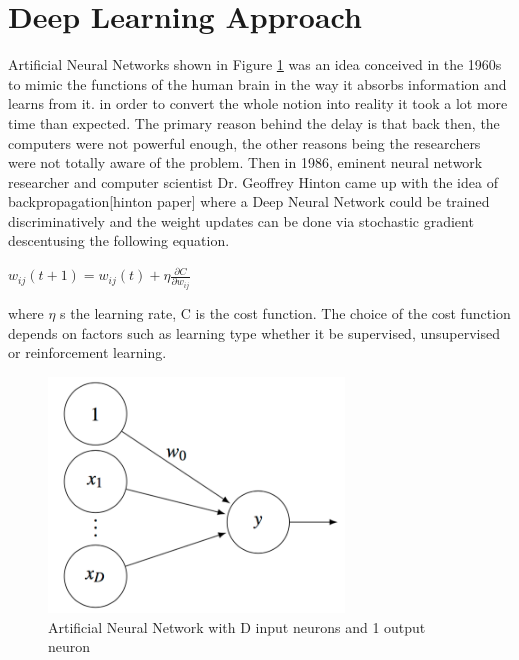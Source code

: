 \section{Deep Learning Approach} \label{sec:build4}

Artificial Neural Networks shown in Figure \ref{fig:Figure20} was an idea conceived  in the 1960s to mimic the functions of the human brain in the way it absorbs information and learns from it. in order to  convert the whole notion into reality it took a lot more time than expected. The primary reason behind the delay is that back then, the computers were not powerful enough, the other reasons being the researchers were not totally aware of the problem. Then in 1986, eminent neural network researcher and computer scientist Dr. Geoffrey Hinton came up with the idea of backpropagation[hinton paper] where a Deep Neural Network could be trained discriminatively and the weight updates can be done via stochastic gradient descentusing the following equation.

\begin{center}
	$w_{ij}(t+1) = w_{ij}(t) + \eta \frac{\partial C}{\partial w_{ij}}$
\end{center}
where $\eta$ s the learning rate, C is the cost function. The choice of the cost function depends on factors such as learning type whether it be supervised, unsupervised or reinforcement learning. 

\begin{figure}[t]
	\begin{center}
		\includegraphics[width=0.7\textwidth]{Figures/Figure20}
	\end{center}
	\caption{Artificial Neural Network with D input neurons and 1 output neuron} 
	\label{fig:Figure20}
\end{figure}


